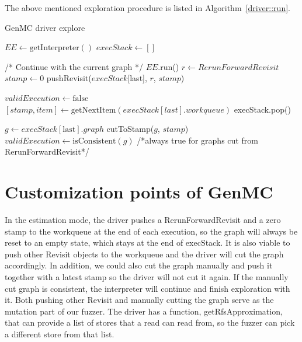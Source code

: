 The above mentioned exploration procedure is listed in Algorithm~\ref{driver::run}.

\begin{algorithm}
	\caption{GenMC driver explore}
	\label{driver::run}
	\begin{algorithmic}[1]
		\STATE $EE \leftarrow \text{getInterpreter}()$
		\STATE $execStack \leftarrow []$

		\STATE /* Continue with the current graph */
		\STATE $EE$.run()
		\STATE $r \leftarrow RerunForwardRevisit$
		\STATE $stamp \leftarrow 0$
		\STATE pushRevisit($execStack$[last], $r$, $stamp$)

		\STATE $validExecution \leftarrow \text{false}$
		\STATE $[{stamp}, {item}] \leftarrow \text{getNextItem}(execStack[last].workqueue)$
		\STATE execStack.pop()
		\STATE {}
		\ELSE
		\RETURN
		\ENDIF

		\ELSE
		\STATE $g \leftarrow execStack[\text{last}].graph$
		\STATE cutToStamp($g$, $stamp$)
		\STATE $validExecution \leftarrow \text{isConsistent}(g)$   /*always true for graphs cut from RerunForwardRevisit*/
		\ENDIF
		\ENDWHILE
		\ENDWHILE
	\end{algorithmic}
\end{algorithm}





\section{Customization points of GenMC}

In the estimation mode, the driver pushes a RerunForwardRevisit and a zero stamp to the workqueue at the end of each execution, so the graph will always be reset to an empty state, which stays at the end of execStack. It is also viable to push other Revisit objects to the workqueue and the driver will cut the graph accordingly. In addition, we could also cut the graph manually and push it together with a latest stamp so the driver will not cut it again. If the manually cut graph is consistent, the interpreter will continue and finish exploration with it. Both pushing other Revisit and manually cutting the graph serve as the mutation part of our fuzzer. The driver has a function, getRfsApproximation, that can provide a list of stores that a read can read from, so the fuzzer can pick a different store from that list.

